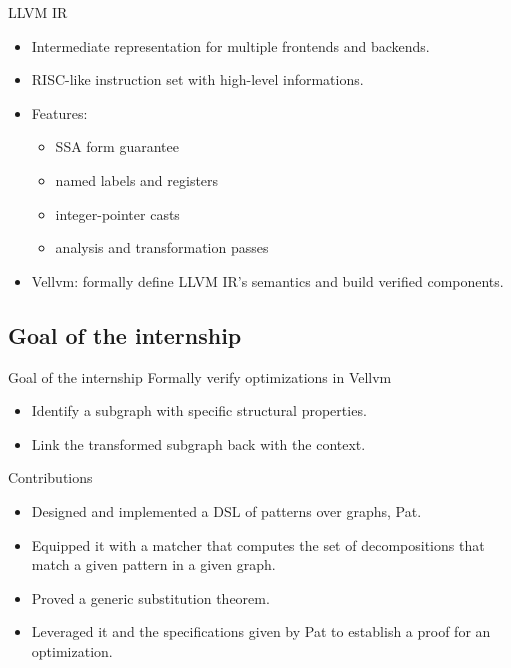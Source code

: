 \documentclass{beamer}
\newcommand{\leon}[1]{\textcolor{blue}{#1}}
\begin{document}
\begin{frame}{LLVM IR}
  \begin{itemize}
    \item Intermediate representation for multiple frontends and backends.
    \item RISC-like instruction set with high-level informations.
    \item Features:\begin{itemize}
            \item SSA form guarantee
            \item named labels and registers
            \item integer-pointer casts
            \item analysis and transformation passes
          \end{itemize}
    \item Vellvm: formally define LLVM IR's semantics and build verified components.
  \end{itemize}
\end{frame}

\subsection*{Goal of the internship}

\begin{frame}
  \begin{block}{Goal of the internship}
    Formally verify optimizations in Vellvm
  \end{block}

  \begin{itemize}
    \item Identify a subgraph with specific structural properties.
    \item Link the transformed subgraph back with the context.
  \end{itemize}
\end{frame}

\begin{frame}{Contributions}
  \begin{itemize}
    \item Designed and implemented a DSL of patterns over graphs, Pat.
    \item Equipped it with a matcher that computes the set of decompositions that match a given pattern in a given graph.
    \item Proved a generic substitution theorem.
    \item Leveraged it and the specifications given by Pat to establish a proof for an optimization.
  \end{itemize}
\end{frame}
\end{document}
